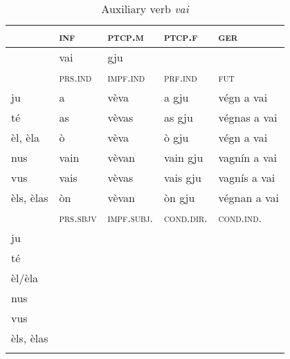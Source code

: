 \begin{table}
\caption{Auxiliary verb \textit{vai}}
\label{tab:aux:vai}
 \begin{tabular}{lllll} %
 
  \lsptoprule
 & \textsc{inf}  & \textsc{ptcp.m}  & \textsc{ptcp.f}  &  \textsc{ger}\\
  \midrule
  &vai &gju &  & \\
     
  \lsptoprule
    &\textsc{prs.ind}  &\textsc{impf.ind} & \textsc{prf.ind} & \textsc{fut}\\
   \midrule
ju &a & vèva &a gju &végn a vai\\
té &as &vèvas &as gju & végnas a vai\\
èl, èla &ò & vèva &ò gju &végn a vai\\
nus &vain &vèvan &vain gju &vagnín a vai\\
vus &vais & vèvas &vais gju &vagnís a vai\\
èls, èlas& òn & vèvan &òn gju &végnan a vai\\

 \lsptoprule
   &\textsc{prs.sbjv} & \textsc{impf.subj.}  &\textsc{cond.dir.} & \textsc{cond.ind.}\\
\midrule
ju& &&& \\
té\\
èl/èla\\
nus\\
vus\\
èls, èlas\\
  \lspbottomrule
 \end{tabular}
\end{table}

